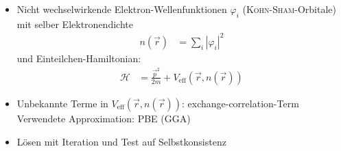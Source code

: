 \begin{frame}
\begin{itemize}
\item Nicht wechselwirkende Elektron-Wellenfunktionen $\varphi_i$  (\textsc{Kohn-Sham}-Orbitale) mit selber Elektronendichte
\begin{align*}
n(\vec{r}) &= \sum_i \left|\varphi_i\right|^2
\end{align*}
und Einteilchen-Hamiltonian:
\begin{align*}
\mathcal{H} &= \frac{\vec{p}^2}{2m} + V_\text{eff}(\vec{r}, n(\vec{r}))
\end{align*}
\item Unbekannte Terme in $V_\text{eff}(\vec{r}, n(\vec{r}))$: exchange-correlation-Term\\
Verwendete Approximation: PBE (GGA)
\item Lösen mit Iteration und Test auf Selbstkonsistenz
\end{itemize}
\end{frame}


